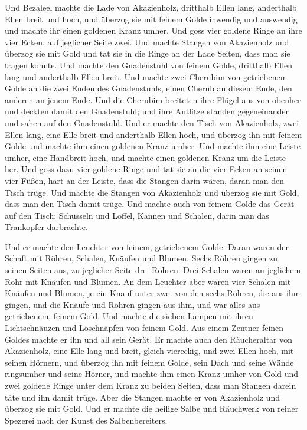  Und Bezaleel machte die Lade von Akazienholz, dritthalb
Ellen lang, anderthalb Ellen breit und hoch,  und überzog
sie mit feinem Golde inwendig und auswendig und machte ihr einen
goldenen Kranz umher.  Und goss vier goldene Ringe an ihre
vier Ecken, auf jeglicher Seite zwei.  Und machte Stangen
von Akazienholz und überzog sie mit Gold  und tat sie in
die Ringe an der Lade Seiten, dass man sie tragen konnte. 
Und machte den Gnadenstuhl von feinem Golde, dritthalb Ellen lang und
anderthalb Ellen breit.  Und machte zwei Cherubim von
getriebenem Golde an die zwei Enden des Gnadenstuhls, 
einen Cherub an diesem Ende, den anderen an jenem Ende. 
Und die Cherubim breiteten ihre Flügel aus von obenher und deckten damit
den Gnadenstuhl; und ihre Antlitze standen gegeneinander und sahen auf
den Gnadenstuhl.  Und er machte den Tisch von
Akazienholz, zwei Ellen lang, eine Elle breit und anderthalb Ellen hoch,
 und überzog ihn mit feinem Golde und machte ihm einen
goldenen Kranz umher.  Und machte ihm eine Leiste umher,
eine Handbreit hoch, und machte einen goldenen Kranz um die Leiste her.
 Und goss dazu vier goldene Ringe und tat sie an die vier
Ecken an seinen vier Füßen,  hart an der Leiste, dass die
Stangen darin wären, daran man den Tisch trüge.  Und
machte die Stangen von Akazienholz und überzog sie mit Gold, dass man
den Tisch damit trüge.  Und machte auch von feinem Golde
das Gerät auf den Tisch: Schüsseln und Löffel, Kannen und Schalen, darin
man das Trankopfer darbrächte.

 Und er machte den Leuchter von feinem, getriebenem
Golde. Daran waren der Schaft mit Röhren, Schalen, Knäufen und Blumen.
 Sechs Röhren gingen zu seinen Seiten aus, zu jeglicher
Seite drei Röhren.  Drei Schalen waren an jeglichem Rohr
mit Knäufen und Blumen.  An dem Leuchter aber waren vier
Schalen mit Knäufen und Blumen,  je ein Knauf unter zwei
von den sechs Röhren, die aus ihm gingen,  und die Knäufe
und Röhren gingen aus ihm, und war alles aus getriebenem, feinem Gold.
 Und machte die sieben Lampen mit ihren Lichtschnäuzen
und Löschnäpfen von feinem Gold.  Aus einem Zentner
feinen Goldes machte er ihn und all sein Gerät.  Er
machte auch den Räucheraltar von Akazienholz, eine Elle lang und breit,
gleich viereckig, und zwei Ellen hoch, mit seinen Hörnern,
 und überzog ihn mit feinem Golde, sein Dach und seine
Wände ringsumher und seine Hörner, und machte ihm einen Kranz umher von
Gold  und zwei goldene Ringe unter dem Kranz zu beiden
Seiten, dass man Stangen darein täte und ihn damit trüge.
 Aber die Stangen machte er von Akazienholz und überzog
sie mit Gold.  Und er machte die heilige Salbe und
Räuchwerk von reiner Spezerei nach der Kunst des Salbenbereiters.

